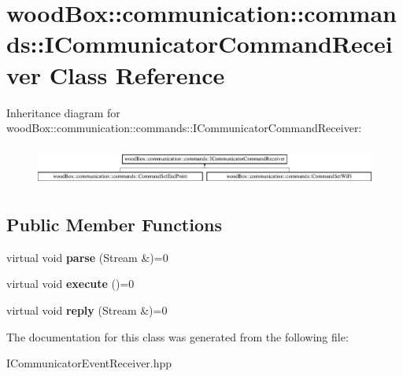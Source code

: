 \hypertarget{classwood_box_1_1communication_1_1commands_1_1_i_communicator_command_receiver}{}\section{wood\+Box\+:\+:communication\+:\+:commands\+:\+:I\+Communicator\+Command\+Receiver Class Reference}
\label{classwood_box_1_1communication_1_1commands_1_1_i_communicator_command_receiver}
Inheritance diagram for wood\+Box\+:\+:communication\+:\+:commands\+:\+:I\+Communicator\+Command\+Receiver\+:\begin{figure}[H]
\begin{center}
\leavevmode
\includegraphics[height=1.333333cm]{classwood_box_1_1communication_1_1commands_1_1_i_communicator_command_receiver}
\end{center}
\end{figure}
\subsection*{Public Member Functions}
\begin{DoxyCompactItemize}
\item 
\mbox{\label{classwood_box_1_1communication_1_1commands_1_1_i_communicator_command_receiver_ab91f2b0d95b2ef78f3b75a7dbad3aa83}} 
virtual void {\bfseries parse} (Stream \&)=0
\item 
\mbox{\label{classwood_box_1_1communication_1_1commands_1_1_i_communicator_command_receiver_a071207a1c875f6a34e6954cc8195b634}} 
virtual void {\bfseries execute} ()=0
\item 
\mbox{\label{classwood_box_1_1communication_1_1commands_1_1_i_communicator_command_receiver_a785222770f3d4b4fd2fb1cd457ae99a5}} 
virtual void {\bfseries reply} (Stream \&)=0
\end{DoxyCompactItemize}


The documentation for this class was generated from the following file\+:\begin{DoxyCompactItemize}
\item 
I\+Communicator\+Event\+Receiver.\+hpp\end{DoxyCompactItemize}
